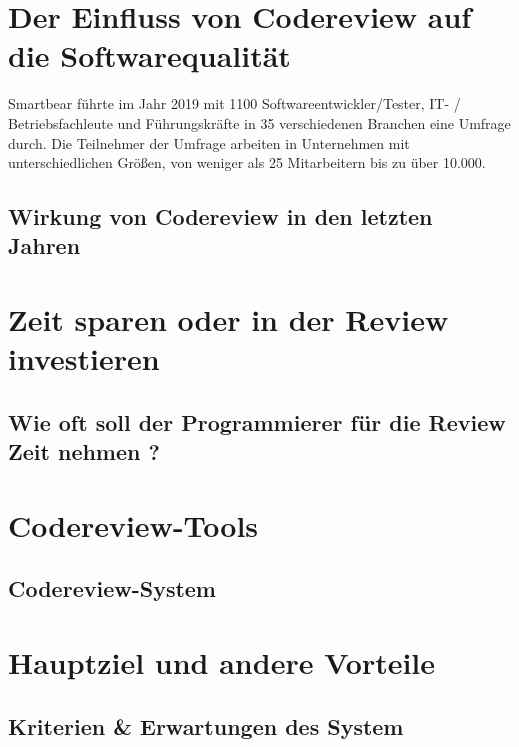 \section{Der Einfluss von Codereview auf die Softwarequalität}
\label{sec:rEinfluss}
Smartbear \cite{smartbear} führte im Jahr 2019 mit 1100 Softwareentwickler/Tester, IT- / Betriebsfachleute und Führungskräfte in 35 verschiedenen Branchen eine Umfrage durch. Die Teilnehmer der Umfrage arbeiten in Unternehmen mit unterschiedlichen Größen, von weniger als 25 Mitarbeitern bis zu über 10.000.

\subsection{Wirkung von Codereview in den letzten Jahren}
\label{subsec:rWirkung}

\section{Zeit sparen oder in der Review investieren}
\label{sec:reviewZeit}

\subsection{Wie oft soll der Programmierer für die Review Zeit nehmen ?}
\label{subsec:reviewerZeit}

\section{Codereview-Tools}
\label{sec:Coderview-Tools}


\subsection{Codereview-System}
\label{subsec:CRS}

\section{Hauptziel und andere Vorteile}
\label{sec:Ziel}

\subsection{Kriterien \& Erwartungen des System}
\label{sec:kriterien}
